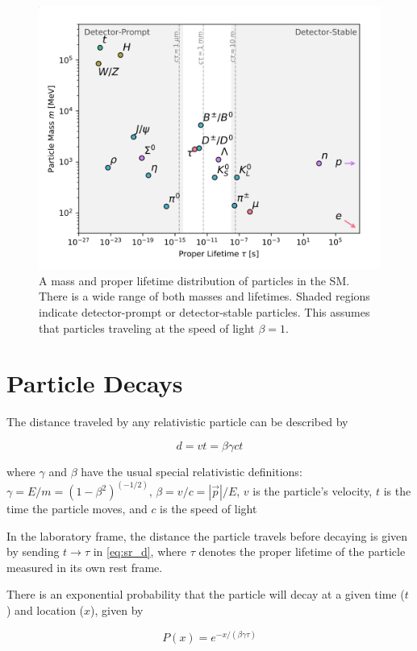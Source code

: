 \begin{figure}[htbp]
\centering
\includegraphics[width=.8\textwidth]{figures/theory/LLP-mass-lifetime.png}
\caption{A mass and proper lifetime distribution of particles in the \ac{SM}. There is a wide range of both masses and lifetimes. Shaded regions indicate detector-prompt or detector-stable particles. This assumes that particles traveling at the speed of light $\beta = 1$.}
\label{fig:llp-mass-lifetime}
\end{figure}

\section{Particle Decays}

The distance traveled by any relativistic particle can be described by

\begin{equation}
d = vt = \beta \gamma c t
\label{eq:sr_d}
\end{equation}

where $\gamma$ and $\beta$ have the usual special relativistic definitions: $\gamma = E/m = (1-\beta^2)^(-1/2)$, $\beta = v/c = |\vec{p}|/E$, $v$ is the particle's velocity, $t$ is the time the particle moves, and $c$ is the speed of light 

In the laboratory frame, the distance the particle travels before decaying is given by sending $t \rightarrow \tau$ in \autoref{eq:sr_d}, where $\tau$ denotes the proper lifetime of the particle measured in its own rest frame.

There is an exponential probability that the particle will decay at a given time ($t$) and location ($x$), given by 

\begin{equation}
P(x) = e ^{-x/(\beta \gamma \tau)}
\end{equation}

